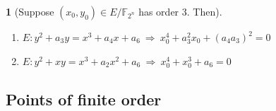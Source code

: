 \documentclass[10pt,handout]{beamer}%
\newcommand{\F}{\mathbb F}
\theoremstyle{definition}
\newtheorem{exercise}[theorem]{\translate{Fact:}}
\begin{document}
\begin{frame}
\begin{exercise}[Suppose $(x_0,y_0)\in E/\F_{2^n}$ has order $3$. Then]
\begin{enumerate}[<+-| alert@+>]
  \item $E: y^2+a_3y=x^3+a_4x+a_6\ \Rightarrow\ x_0^4+a_3^2x_0+(a_4a_3)^2=0$
  \item $E: y^2+xy=x^3+a_2x^2+a_6\ \Rightarrow\ x_0^4+x_0^3+a_6=0$
\end{enumerate}
\end{exercise}


\end{frame}

\subsection{Points of finite order}
\end{document}
